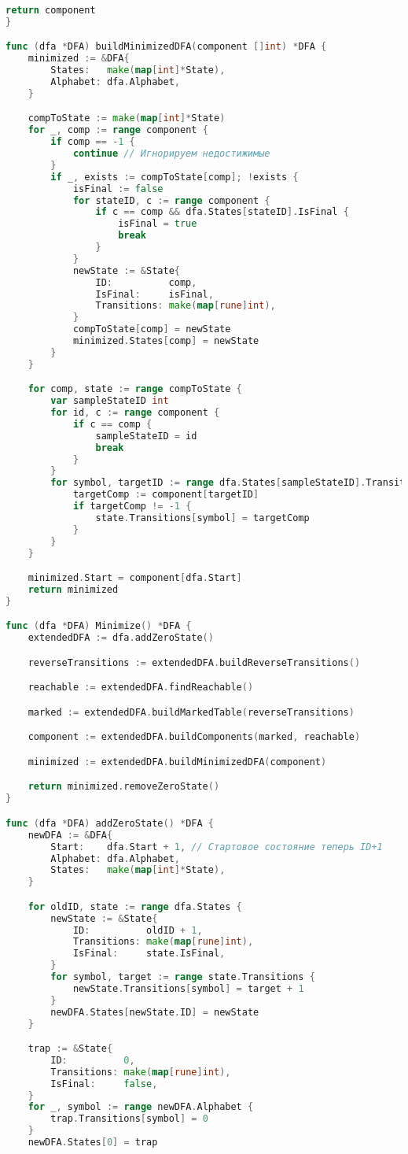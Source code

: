 \begin{lstlisting}[language=Go, caption={Код модуля \textit{dfa}}]
	return component
}

func (dfa *DFA) buildMinimizedDFA(component []int) *DFA {
	minimized := &DFA{
		States:   make(map[int]*State),
		Alphabet: dfa.Alphabet,
	}

	compToState := make(map[int]*State)
	for _, comp := range component {
		if comp == -1 {
			continue // Игнорируем недостижимые
		}
		if _, exists := compToState[comp]; !exists {
			isFinal := false
			for stateID, c := range component {
				if c == comp && dfa.States[stateID].IsFinal {
					isFinal = true
					break
				}
			}
			newState := &State{
				ID:          comp,
				IsFinal:     isFinal,
				Transitions: make(map[rune]int),
			}
			compToState[comp] = newState
			minimized.States[comp] = newState
		}
	}

	for comp, state := range compToState {
		var sampleStateID int
		for id, c := range component {
			if c == comp {
				sampleStateID = id
				break
			}
		}
		for symbol, targetID := range dfa.States[sampleStateID].Transitions {
			targetComp := component[targetID]
			if targetComp != -1 {
				state.Transitions[symbol] = targetComp
			}
		}
	}

	minimized.Start = component[dfa.Start]
	return minimized
}

func (dfa *DFA) Minimize() *DFA {
	extendedDFA := dfa.addZeroState()

	reverseTransitions := extendedDFA.buildReverseTransitions()

	reachable := extendedDFA.findReachable()

	marked := extendedDFA.buildMarkedTable(reverseTransitions)

	component := extendedDFA.buildComponents(marked, reachable)

	minimized := extendedDFA.buildMinimizedDFA(component)

	return minimized.removeZeroState()
}

func (dfa *DFA) addZeroState() *DFA {
	newDFA := &DFA{
		Start:    dfa.Start + 1, // Стартовое состояние теперь ID+1
		Alphabet: dfa.Alphabet,
		States:   make(map[int]*State),
	}

	for oldID, state := range dfa.States {
		newState := &State{
			ID:          oldID + 1,
			Transitions: make(map[rune]int),
			IsFinal:     state.IsFinal,
		}
		for symbol, target := range state.Transitions {
			newState.Transitions[symbol] = target + 1
		}
		newDFA.States[newState.ID] = newState
	}

	trap := &State{
		ID:          0,
		Transitions: make(map[rune]int),
		IsFinal:     false,
	}
	for _, symbol := range newDFA.Alphabet {
		trap.Transitions[symbol] = 0
	}
	newDFA.States[0] = trap


\end{lstlisting}
